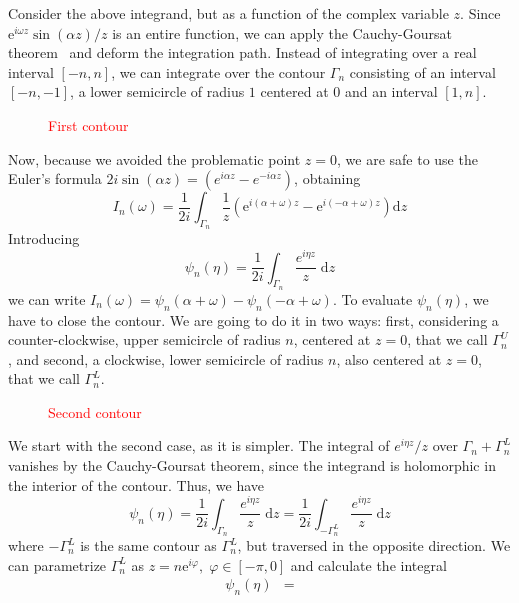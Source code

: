 Consider the above integrand, but as a function of the complex variable \(z\). Since \(\mathrm{e}^{i \omega  z}  \sin (\alpha z)/z\)
is an entire function, we can apply the Cauchy-Goursat theorem~\autocite{Byron1992} and deform the integration path.
Instead of integrating over a real interval \([-n,n]\), we can integrate over the contour \(\Gamma_n\) consisting of
an interval \([-n,-1]\), a lower semicircle of radius \(1\) centered at \(0\) and an interval \([1,n]\).
\begin{figure}
    \centering
    \textcolor{red}{First contour}
    \label{fig:contour_gamma_n}
\end{figure}
Now, because we avoided the problematic point \(z=0\), we are safe to use the Euler's formula
\(2i\sin (\alpha z) = \left( e^{i \alpha z} - e^{-i \alpha  z} \right) \), obtaining
\begin{equation}
    I_n(\omega ) = \frac{1}{2i} \int_{\Gamma_n} \frac{1}{z} \left( \mathrm{e}^{i (\alpha + \omega )z}- \mathrm{e}^{i(-\alpha + \omega )z}  \right)  \mathrm{d}z
\end{equation} 
Introducing 
\begin{equation}
    \psi_n(\eta ) = \frac{1}{2i} \int_{\Gamma_n} \frac{e^{i \eta z}}{z}\; \mathrm{d}z
\end{equation}
we can write \(I_n(\omega ) = \psi _n(\alpha +\omega ) - \psi _n (-\alpha + \omega )\). To evaluate \(\psi _n(\eta )\),
we have to close the contour. We are going to do it in two ways: first, considering a counter-clockwise, upper semicircle
of radius \(n\), centered at \(z=0\), that we call \(\Gamma_n^U\), and second, a clockwise, lower semicircle of radius \(n\),
also centered at \(z=0\), that we call \(\Gamma_n^L\).

\begin{figure}[htbp]
    \centering
    \textcolor{red}{Second contour}    
    \label{<label>}
\end{figure}

We start with the second case, as it is simpler. The integral of \(e^{i \eta z}/z\) over \(\Gamma_n + \Gamma_n^L\) vanishes
by the Cauchy-Goursat theorem, since the integrand is holomorphic in the interior of the contour. Thus, we have
\begin{equation}
    \psi _n(\eta ) = \frac{1}{2i} \int_{\Gamma_n} \frac{e^{i \eta z}}{z}\; \mathrm{d}z = \frac{1}{2i} \int_{-\Gamma_n^L} \frac{e^{i \eta z}}{z}\; \mathrm{d}z
\end{equation}
where \(-\Gamma_n^L\) is the same contour as \(\Gamma_n^L\), but traversed in the opposite direction. We can parametrize
\(\Gamma _n^L\) as \(z = n \mathrm{e}^{i \varphi },\; \varphi  \in \left[ -\pi , 0 \right]  \) and calculate the integral
\begin{align}
    \psi _n(\eta ) &= 
\end{align}